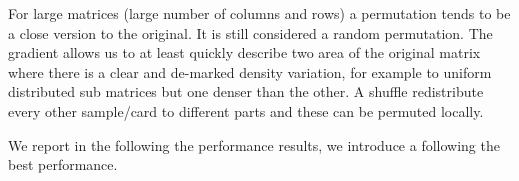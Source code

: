 \documentclass[manuscript,screen]{acmart}
\begin{document}
For large matrices (large number of columns and rows) a permutation
tends to be a close version to the original. It is still considered a
random permutation. The gradient allows us to at least quickly
describe two area of the original matrix where there is a clear and
de-marked density variation, for example to uniform distributed sub
matrices but one denser than the other. A shuffle redistribute every
other sample/card to different parts and these can be permuted
locally.


    
We report in the following the performance results, we introduce a
{\bf *} following the best performance. 

 



%

 

%
\end{document}
